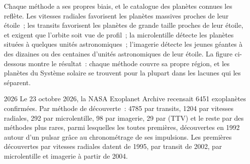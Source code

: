 Chaque méthode a ses propres biais, et le catalogue des planètes connues
les reflète. Les vitesses radiales favorisent les planètes massives proches de leur étoile~;
les transits favorisent les planètes de grande taille proches de leur étoile, et exigent
que l'orbite soit vue de profil~; la microlentille détecte les planètes situées à quelques unités astronomiques~;
l'imagerie détecte les jeunes géantes à des dizaines ou des centaines d'unités astronomiques de leur étoile.
La figure ci-dessous montre le résultat~: chaque méthode couvre sa propre région, et
les planètes du Système solaire se trouvent pour la plupart dans les lacunes qui les séparent.

\begin{dated}{2026}
Le 23 octobre 2026, la NASA Exoplanet Archive recensait 6451 exoplanètes confirmées.
Par méthode de découverte~: 4785 par transits, 1204 par vitesses radiales,
292 par microlentille, 98 par imagerie, 29 par  (TTV)
et le reste par des méthodes plus rares, parmi lesquelles les toutes premières,
découvertes en 1992 autour d'un pulsar grâce au chronométrage de ses impulsions.
Les premières découvertes par vitesses radiales datent de 1995, par transit de 2002, par
microlentille et imagerie à partir de 2004.
\end{dated}

